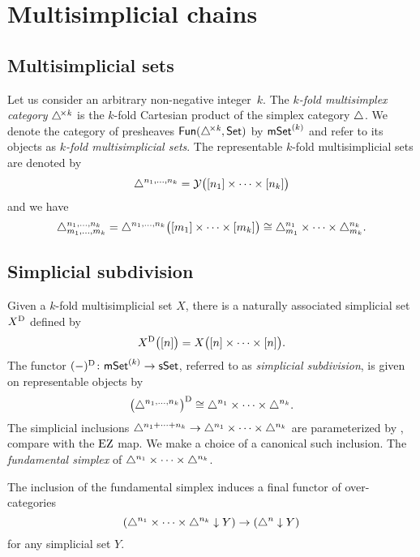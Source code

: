 
\section{Multisimplicial chains}

\subsection{Multisimplicial sets}

Let us consider an arbitrary non-negative integer~$k$.
The \textit{$k$-fold multisimplex category} $\triangle^{\!\times\mathit{k}}$ is the $k$-fold Cartesian product of the simplex category $\triangle$.
We denote the category of presheaves $\mathsf{Fun}(\triangle^{\!\times\mathit{k}}, \mathsf{Set})$ by $\mathsf{mSet}^{(k)}$ and refer to its objects as \textit{$k$-fold multisimplicial sets}.
The representable $k$-fold multisimplicial sets are denoted by
\[
\triangle^{n_1, \dots, n_k} = \mathcal{Y} \big( [n_1] \times \cdots \times [n_k] \big)
\]
and we have
\[
\triangle^{n_1, \dots, n_k}_{m_1, \dots, m_k} =
\triangle^{n_1, \dots, n_k} \big( [m_1] \times \cdots \times [m_k] \big) \cong
\triangle^{n_1}_{m_1} \times \dots \times \triangle^{n_k}_{m_k}.
\]

\subsection{Simplicial subdivision} \label{ss:simplicial subdivision}

Given a $k$-fold multisimplicial set $X$, there is a naturally associated simplicial set $X^{\operatorname{D}}$ defined by
\[
X^{\operatorname{D}} \big( [n] \big) = X \big( [n] \times \dots \times [n] \big).
\]
The functor $(-)^{\operatorname{D}} \colon \mathsf{mSet}^{(k)} \to \mathsf{sSet}$, referred to as \textit{simplicial subdivision}, is given on representable objects by
\[
\big( \triangle^{n_1, \dots, n_k} \big)^{\operatorname{D}} \cong
\triangle^{n_1} \times \dots \times \triangle^{n_k}.
\]
The simplicial inclusions $\triangle^{n_1 + \dots + n_k} \to \triangle^{n_1} \times \dots \times \triangle^{n_k}$ are parameterized by , compare with the $\operatorname{EZ}$ map.
We make a choice of a canonical such inclusion.
The \textit{fundamental simplex} of $\triangle^{n_1} \times \dots \times \triangle^{n_k}$. 
\begin{lemma}
	The inclusion of the fundamental simplex induces a final functor of over-categories
	\[
	(\triangle^{n_1} \times \dots \times \triangle^{n_k} \downarrow Y) \to (\triangle^n \downarrow Y)
	\]
	for any simplicial set $Y$.
\end{lemma}

